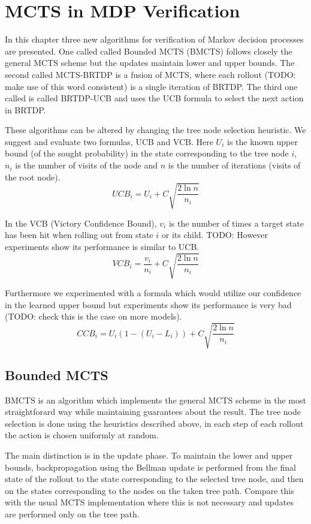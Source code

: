 \chapter{MCTS in MDP Verification}

In this chapter three new algorithms for verification of Markov
decision processes are presented. One called
called Bounded MCTS (BMCTS) follows closely the general MCTS scheme
but the updates maintain lower and upper bounds. The second called
MCTS-BRTDP is a fusion of MCTS, where each rollout (TODO: make use of
this word consistent) is a single iteration of BRTDP.
The third one called is called BRTDP-UCB and uses the UCB formula to
select the next action in BRTDP.

These algorithms can be altered by changing the tree node selection
heuristic. We suggest and evaluate two formulas, UCB and VCB. Here $U_i$
is the known upper bound (of the sought probability) in the state
corresponding to the tree node $i$, $n_i$ is the number of visits of the
node and $n$ is the number of iterations (visits of
the root node).
\begin{equation*}
    UCB_i = U_i + C \sqrt{ \frac{2 \ln n}{n_i} }
\end{equation*}

In the VCB (Victory Confidence Bound), $v_i$ is the number of times a
target state has been hit when rolling out from state $i$ or its child.
TODO: However experiments show its performance is similar to UCB.
\[
    VCB_i = \frac{v_i}{n_i} + C \sqrt{ \frac{2 \ln n}{n_i} }
\]

Furthermore we experimented with a formula which would utilize our
confidence in the learned upper bound but experiments show its
performance is very bad (TODO: check this is the case on more models).
\[
    CCB_i = U_i (1 - (U_i - L_i)) + C \sqrt{ \frac{2 \ln n}{n_i} }
\]


\section{Bounded MCTS}

BMCTS is an algorithm which implements the general MCTS scheme in the
most straightforard way while maintaining guarantees about the result.
The tree node selection is done using the
heuristics described above, in each step of each rollout the action is
chosen uniformly at random.

The main distinction is in the update phase. To maintain the lower and
upper bounds, backpropagation using the Bellman update is performed
from the final state of the rollout to the state corresponding to
the selected tree node, and then on the states corresponding to the
nodes on the taken tree path. Compare this with the usual MCTS
implementation where this is not necessary and updates are performed
only on the tree path.

